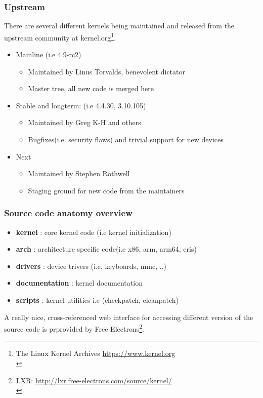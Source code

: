 \documentclass{beamer}
\begin{document}
\begin{frame}
\frametitle{Upstream}

There are several different kernels being maintained and released from the upstream community at kernel.org\footnote{The Linux Kernel Archives \url{https://www.kernel.org}\\}.

\begin{itemize}
	\item Mainline (i.e 4.9-rc2)
	\begin{itemize}
		\item Maintained by Linus Torvalds, benevolent dictator
		\item Master tree, all new code is merged here
	\end{itemize}
	\item Stable and longterm: (i.e 4.4.30, 3.10.105)
	\begin{itemize}
		\item Maintained by Greg K-H and others
		\item Bugfixes(i.e. security flaws) and trivial support for new devices
	\end{itemize}
	\item Next 
	\begin{itemize}	
		\item Maintained by Stephen Rothwell
		\item Staging ground for new code from the maintainers
	\end{itemize}
\end{itemize}
\end{frame}

\begin{frame}
\frametitle{Source code anatomy overview}
\begin{itemize}
	\item \textbf{kernel} : core kernel code (i.e kernel initialization) \\
	\item \textbf{arch} : architecture specific code(i.e x86, arm, arm64, cris) \\
	\item \textbf{drivers} : device trivers (i.e, keyboards, mmc, ..) \\
	\item \textbf{documentation} : kernel documentation \\
	\item \textbf{scripts} : kernel utilities i.e (checkpatch, cleanpatch) \\
\end{itemize}

A really nice, cross-referenced web interface for accessing different version of the source code is prprovided by Free Electrons\footnote{LXR: \url{http://lxr.free-electrons.com/source/kernel/}\\}.
\end{frame}
\end{document}
